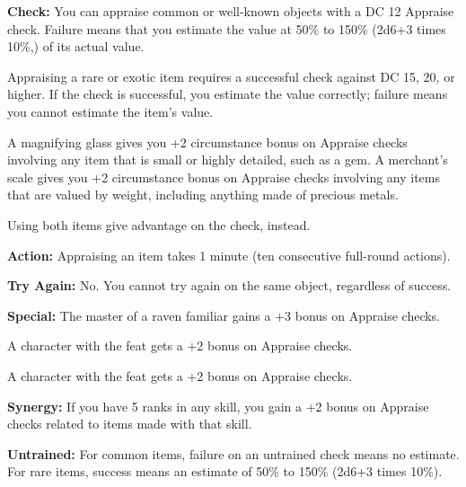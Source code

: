 \textbf{Check:} You can appraise common or well-known objects with a DC 12 Appraise check. Failure means that you estimate the value at 50\% to 150\% (2d6+3 times 10\%,) of its actual value.

Appraising a rare or exotic item requires a successful check against DC 15, 20, or higher. If the check is successful, you estimate the value correctly; failure means you cannot estimate the item's value.

A magnifying glass gives you +2 circumstance bonus on Appraise checks involving any item that is small or highly detailed, such as a gem. A merchant's scale gives you +2 circumstance bonus on Appraise checks involving any items that are valued by weight, including anything made of precious metals.

Using both items give advantage on the check, instead.

\textbf{Action:} Appraising an item takes 1 minute (ten consecutive full-round actions).

\textbf{Try Again:} No. You cannot try again on the same object, regardless of success.

\textbf{Special:} The master of a raven familiar gains a +3 bonus on Appraise checks.

A character with the  feat gets a +2 bonus on Appraise checks.

A character with the  feat gets a +2 bonus on Appraise checks.

\textbf{Synergy:} If you have 5 ranks in any  skill, you gain a +2 bonus on Appraise checks related to items made with that  skill.

\textbf{Untrained:} For common items, failure on an untrained check means no estimate. For rare items, success means an estimate of 50\% to 150\% (2d6+3 times 10\%).